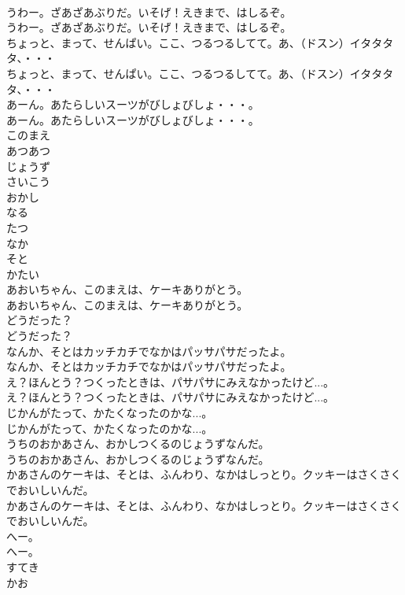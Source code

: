 \documentclass[8pt]{extreport}
\begin{document}
\begin{CJK}{UTF8}{min}
\\	うわー。ざあざあぶりだ。いそげ！えきまで、はしるぞ。
\\	うわー。ざあざあぶりだ。いそげ！えきまで、はしるぞ。
\\	ちょっと、まって、せんぱい。ここ、つるつるしてて。あ、（ドスン）イタタタタ、・・・
\\	ちょっと、まって、せんぱい。ここ、つるつるしてて。あ、（ドスン）イタタタタ、・・・
\\	あーん。あたらしいスーツがびしょびしょ・・・。
\\	あーん。あたらしいスーツがびしょびしょ・・・。
\\	このまえ
\\	あつあつ
\\	じょうず
\\	さいこう
\\	おかし
\\	なる
\\	たつ
\\	なか
\\	そと
\\	かたい
\\	あおいちゃん、このまえは、ケーキありがとう。
\\	あおいちゃん、このまえは、ケーキありがとう。
\\	どうだった？
\\	どうだった？
\\	なんか、そとはカッチカチでなかはパッサパサだったよ。
\\	なんか、そとはカッチカチでなかはパッサパサだったよ。
\\	え？ほんとう？つくったときは、パサパサにみえなかったけど...。
\\	え？ほんとう？つくったときは、パサパサにみえなかったけど...。
\\	じかんがたって、かたくなったのかな...。
\\	じかんがたって、かたくなったのかな...。
\\	うちのおかあさん、おかしつくるのじょうずなんだ。
\\	うちのおかあさん、おかしつくるのじょうずなんだ。
\\	かあさんのケーキは、そとは、ふんわり、なかはしっとり。クッキーはさくさくでおいしいんだ。
\\	かあさんのケーキは、そとは、ふんわり、なかはしっとり。クッキーはさくさくでおいしいんだ。
\\	へー。
\\	へー。
\\	すてき
\\	かお

\end{CJK}
\end{document}
